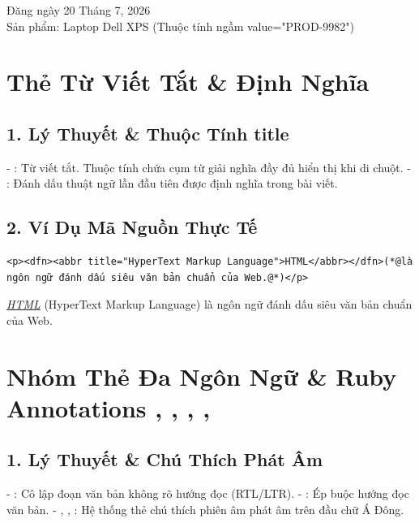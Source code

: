 \begin{browserWindow}
\sffamily\small
Đăng ngày 20 Tháng 7, 2026\\[2pt]
Sản phẩm: Laptop Dell XPS \textcolor{gray!70}{\small(Thuộc tính ngầm value="PROD-9982")}
\end{browserWindow}

\section{Thẻ Từ Viết Tắt  \& Định Nghĩa }
\subsection{1. Lý Thuyết \& Thuộc Tính title}
- : Từ viết tắt. Thuộc tính  chứa cụm từ giải nghĩa đầy đủ hiển thị khi di chuột.
- : Đánh dấu thuật ngữ lần đầu tiên được định nghĩa trong bài viết.

\subsection{2. Ví Dụ Mã Nguồn Thực Tế}
\begin{codeWindow}
\begin{lstlisting}[language=HTML5]
<p><dfn><abbr title="HyperText Markup Language">HTML</abbr></dfn>(*@là ngôn ngữ đánh dấu siêu văn bản chuẩn của Web.@*)</p>
\end{lstlisting}
\end{codeWindow}

\begin{browserWindow}
\sffamily\small
\textit{\underline{HTML}} (HyperText Markup Language) là ngôn ngữ đánh dấu siêu văn bản chuẩn của Web.
\end{browserWindow}

\section{Nhóm Thẻ Đa Ngôn Ngữ \& Ruby Annotations , , , , }
\subsection{1. Lý Thuyết \& Chú Thích Phát Âm}
- : Cô lập đoạn văn bản không rõ hướng đọc (RTL/LTR).
- : Ép buộc hướng đọc văn bản.
- , , : Hệ thống thẻ chú thích phiên âm phát âm trên đầu chữ Á Đông.


